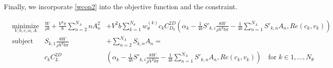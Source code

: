 \documentclass[letterpaper,12pt]{article}
\begin{document}


Finally, we incorporate \ref{wcon2} into the objective function and the constraint.

\begin{align*}
	& \underset{V, b, c, \alpha, A}{\text{minimize}} &
	\frac{W}{\rho b} + \frac{V^2 \pi}{8}\sum_{n=2}^{N_A} n A_{n}^2 &+
	  V^2 b  \sum_{k=1}^{N_{\theta}} w_{\theta}^{(k)} c_k C_{D_0}^{2D}
	  \left( \alpha_k
	  - \frac {1}{4b} S'_{k,i}\frac{8W}{\rho V^2 b \pi}
	  - \frac {1}{4b}\sum_{n=1}^{N_{A}}S'_{k,n}A_n , Re(c_k, v_k)
	  \right)\\
	& \text{subject to} &
 	S_{k, 1} \frac{8W}{\rho V^2 b \pi} &+ \sum_{n=2}^{N_{A}} S_{k,n} A_n = \\
	& & c_kC_L^{2D} & \left( \alpha_k
		 - \frac {1}{4b} S'_{k,i}\frac{8W}{\rho V^2 b \pi}
		 - \frac {1}{4b}\sum_{n=1}^{N_{A}}S'_{k,n}A_n , Re(c_k, v_k)\right)
		 \quad \text{for } k \in 1,\dots, N_{\theta}
\end{align*}
\end{document}
